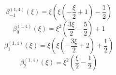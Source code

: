 \begin{equation}
\beta_{-1}^{(1,4)} (\xi) =
 \xi \left(\xi \left(- \frac{\xi}{2} + 1\right) - \frac{1}{2}\right)
\end{equation}
\begin{equation}
\beta_{0}^{(1,4)} (\xi) =
 \xi^{2} \left(\frac{3 \xi}{2} - \frac{5}{2}\right) + 1
\end{equation}
\begin{equation}
\beta_{1}^{(1,4)} (\xi) =
 \xi \left(\xi \left(- \frac{3 \xi}{2} + 2\right) + \frac{1}{2}\right)
\end{equation}
\begin{equation}
\beta_{2}^{(1,4)} (\xi) =
 \xi^{2} \left(\frac{\xi}{2} - \frac{1}{2}\right)
\end{equation}

